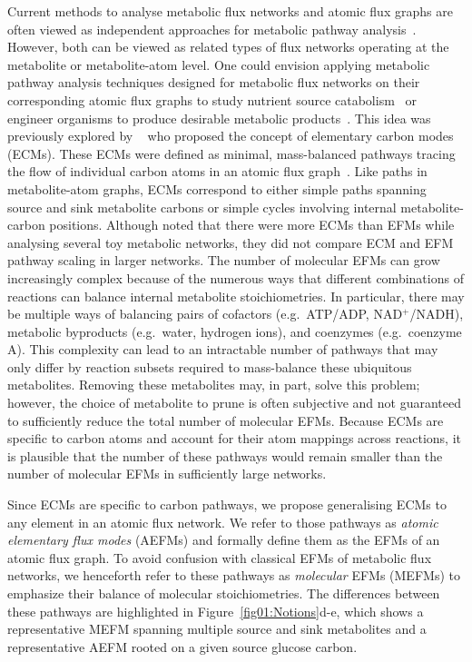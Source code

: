 \documentclass[12pt]{article}
\begin{document}
Current methods to analyse metabolic flux networks and atomic flux graphs
are often viewed as independent approaches for metabolic pathway
analysis~\citep{deFigueiredoLuisF.2009Csbp,AlgfoorZeyadAbd2017Iomp}.
However, both can be viewed as related types of flux networks operating at
the metabolite or metabolite-atom level. One could envision applying
metabolic pathway analysis techniques designed for metabolic flux networks
on their corresponding atomic flux graphs to study nutrient source
catabolism~\citep{ZamboniNicola2015DtMS} or engineer organisms to produce
desirable metabolic products~\citep{ZanghelliniJurgen2013Efmi}. This idea
was previously explored by
\citeauthor{PeyJon2011Defm}~\citep{PeyJon2011Defm} who proposed the
concept of elementary carbon modes (ECMs). These ECMs were defined as
minimal, mass-balanced pathways tracing the flow of individual carbon
atoms in an atomic flux graph~\citep{PeyJon2011Defm,PeyJon2012Itmd}. Like
paths in metabolite-atom graphs, ECMs correspond to either simple paths
spanning source and sink metabolite carbons or simple cycles involving
internal metabolite-carbon positions. Although \citeauthor{PeyJon2012Itmd}
noted that there were more ECMs than EFMs while analysing several toy
metabolic networks, they did not compare ECM and EFM pathway scaling in
larger networks. The number of molecular EFMs can grow increasingly
complex because of the numerous ways that different combinations of
reactions can balance internal metabolite stoichiometries. In particular,
there may be multiple ways of balancing pairs of cofactors (e.g.\ ATP/ADP,
NAD$^+$/NADH), metabolic byproducts (e.g.\ water, hydrogen ions), and
coenzymes (e.g.\ coenzyme A). This complexity can lead to an intractable
number of pathways that may only differ by reaction subsets required to
mass-balance these ubiquitous metabolites. Removing these metabolites may,
in part, solve this problem; however, the choice of metabolite to prune is
often subjective and not guaranteed to sufficiently reduce the total
number of molecular EFMs. Because ECMs are specific to carbon atoms
and account for their atom mappings across reactions, it is plausible that
the number of these pathways would remain smaller than the number of
molecular EFMs in sufficiently large networks.

Since ECMs are specific to carbon pathways, we propose generalising ECMs
to any element in an atomic flux network. We refer to those pathways as
\emph{atomic elementary flux modes} (AEFMs) and formally define them as
the EFMs of an atomic flux graph. To avoid confusion with classical EFMs
of metabolic flux networks, we henceforth refer to these pathways as
\emph{molecular} EFMs (MEFMs) to emphasize their balance of molecular
stoichiometries. The differences between these pathways are highlighted in
Figure~\ref{fig01:Notions}d-e, which shows a representative MEFM spanning
multiple source and sink metabolites and a representative AEFM rooted on
a given source glucose carbon.
\end{document}
